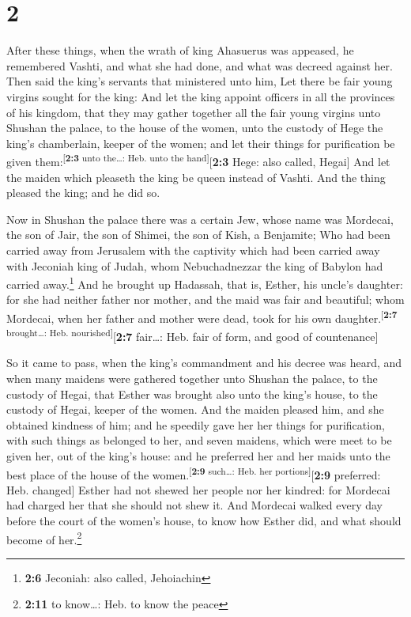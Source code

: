\hypertarget{section-1}{%
\section{2}\label{section-1}}

 After these things, when the wrath of king Ahasuerus was
appeased, he remembered Vashti, and what she had done, and what was
decreed against her.  Then said the king's servants that
ministered unto him, Let there be fair young virgins sought for the
king:  And let the king appoint officers in all the
provinces of his kingdom, that they may gather together all the fair
young virgins unto Shushan the palace, to the house of the women, unto
the custody of Hege the king's chamberlain, keeper of the women; and let
their things for purification be given
them:\textsuperscript{{[}\textbf{2:3} unto the\ldots: Heb. unto the
hand{]}}{[}\textbf{2:3} Hege: also called, Hegai{]}  And
let the maiden which pleaseth the king be queen instead of Vashti. And
the thing pleased the king; and he did so.

 Now in Shushan the palace there was a certain Jew, whose
name was Mordecai, the son of Jair, the son of Shimei, the son of Kish,
a Benjamite;  Who had been carried away from Jerusalem
with the captivity which had been carried away with Jeconiah king of
Judah, whom Nebuchadnezzar the king of Babylon had carried
away.\footnote{\textbf{2:6} Jeconiah: also called, Jehoiachin}
 And he brought up Hadassah, that is, Esther, his uncle's
daughter: for she had neither father nor mother, and the maid was fair
and beautiful; whom Mordecai, when her father and mother were dead, took
for his own daughter.\textsuperscript{{[}\textbf{2:7} brought\ldots:
Heb. nourished{]}}{[}\textbf{2:7} fair\ldots: Heb. fair of form, and
good of countenance{]}

 So it came to pass, when the king's commandment and his
decree was heard, and when many maidens were gathered together unto
Shushan the palace, to the custody of Hegai, that Esther was brought
also unto the king's house, to the custody of Hegai, keeper of the
women.  And the maiden pleased him, and she obtained
kindness of him; and he speedily gave her her things for purification,
with such things as belonged to her, and seven maidens, which were meet
to be given her, out of the king's house: and he preferred her and her
maids unto the best place of the house of the
women.\textsuperscript{{[}\textbf{2:9} such\ldots: Heb. her
portions{]}}{[}\textbf{2:9} preferred: Heb. changed{]} 
Esther had not shewed her people nor her kindred: for Mordecai had
charged her that she should not shew it.  And Mordecai
walked every day before the court of the women's house, to know how
Esther did, and what should become of her.\footnote{\textbf{2:11} to
  know\ldots: Heb. to know the peace}

